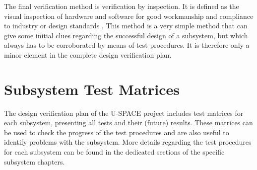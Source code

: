 The final verification method is verification by inspection. It is defined as the visual inspection of hardware and software for good workmanship and compliance to industry or design standards \cite{ECSS_verification}. This method is a very simple method that can give some initial clues regarding the successful design of a subsystem, but which always has to be corroborated by means of test procedures. It is therefore only a minor element in the complete design verification plan.

\section{Subsystem Test Matrices}

The design verification plan of the \ac{U-SPACE} project includes test matrices for each subsystem, presenting all tests and their (future) results. These matrices can be used to check the progress of the test procedures and are also useful to identify problems with the subsystem. More details regarding the test procedures for each subsystem can be found in the dedicated sections of the specific subsystem chapters.